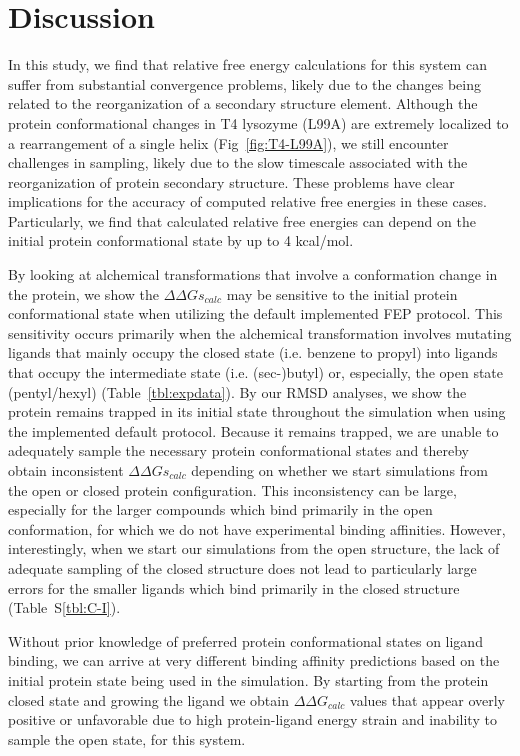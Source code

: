 \documentclass[journal=jctcce,manuscript=article]{achemso}
\begin{document}
\section{Discussion}
In this study, we find that relative free energy calculations for this system can suffer from substantial convergence problems, likely due to the changes being related to the reorganization of a secondary structure element.
Although the protein conformational changes in T4 lysozyme (L99A) are extremely localized to a rearrangement of a single helix (Fig~\ref{fig:T4-L99A}), we still encounter challenges in sampling, likely due to the slow timescale associated with the reorganization of protein secondary structure.
These problems have clear implications for the accuracy of computed relative free energies in these cases. 
Particularly, we find that calculated relative free energies can depend on the initial protein conformational state by up to 4 kcal/mol.

By looking at alchemical transformations that involve a conformation change in the protein, we show the $\Delta\Delta Gs_{calc}$ may be sensitive to the initial protein conformational state when utilizing the default implemented FEP protocol.
This sensitivity occurs primarily when the alchemical transformation involves mutating ligands that mainly occupy the closed state (i.e. benzene to propyl) into ligands that occupy the intermediate state (i.e. (sec-)butyl) or, especially, the open state (pentyl/hexyl) (Table~\ref{tbl:expdata}).
By our RMSD analyses, we show the protein remains trapped in its initial state throughout the simulation when using the implemented default protocol.
Because it remains trapped, we are unable to adequately sample the necessary protein conformational states and thereby obtain inconsistent $\Delta\Delta Gs_{calc}$ depending on whether we start simulations from the open or closed protein configuration.  
This inconsistency can be large, especially for the larger compounds which bind primarily in the open conformation, for which we do not have experimental binding affinities. 
However, interestingly, when we start our simulations from the open structure, the lack of adequate sampling of the closed structure does not lead to particularly large errors for the smaller ligands which bind primarily in the closed structure (Table~S\ref{tbl:C-I}). 

Without prior knowledge of preferred protein conformational states on ligand binding, we can arrive at very different binding affinity predictions based on the initial protein state being used in the simulation.
By starting from the protein closed state and growing the ligand we obtain $\Delta\Delta G_{calc}$ values that appear overly positive or unfavorable due to high protein-ligand energy strain and inability to sample the open state, for this system.
\end{document}
